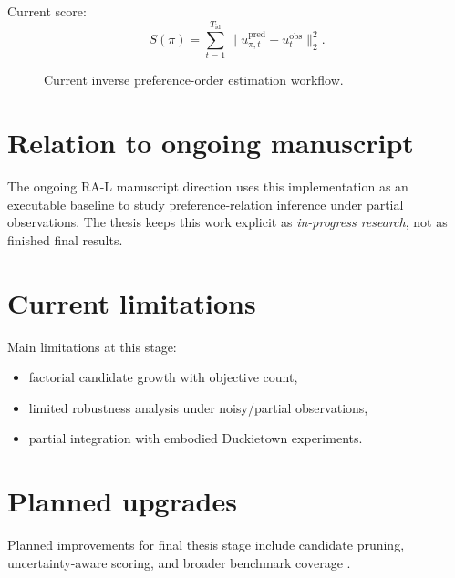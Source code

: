 Current score:
\begin{equation}
S(\pi) = \sum_{t=1}^{T_{\mathrm{id}}}
\|u^{\mathrm{pred}}_{\pi,t} - u^{\mathrm{obs}}_t\|_2^2.
\label{eq:score_inverse_chapter}
\end{equation}

\begin{figure}[tbp]
    \centering
    \caption{Current inverse preference-order estimation workflow.}
    \label{fig:inverse_pipeline}
\end{figure}

\section{Relation to ongoing manuscript}

The ongoing RA-L manuscript direction uses this implementation as an executable
baseline to study preference-relation inference under partial observations. The
thesis keeps this work explicit as \emph{in-progress research}, not as finished
final results.

\section{Current limitations}

Main limitations at this stage:

\begin{itemize}
    \item factorial candidate growth with objective count,
    \item limited robustness analysis under noisy/partial observations,
    \item partial integration with embodied Duckietown experiments.
\end{itemize}

\section{Planned upgrades}

Planned improvements for final thesis stage include candidate pruning,
uncertainty-aware scoring, and broader benchmark coverage
\cite{peters:2023,li:2023,liu:2024}.
